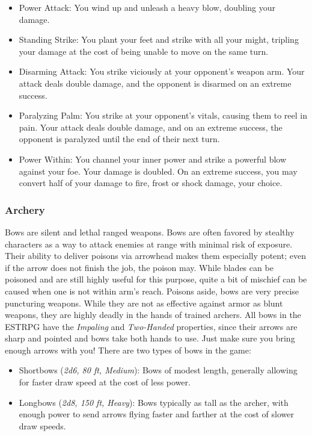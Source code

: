 \begin{itemize}
	\item Power Attack: You wind up and unleash a heavy blow, doubling your damage.
	\item Standing Strike: You plant your feet and strike with all your might, tripling your damage at the cost of being unable to move on the same turn.
	\item Disarming Attack: You strike viciously at your opponent's weapon arm. Your attack deals double damage, and the opponent is disarmed on an extreme success.
	\item Paralyzing Palm: You strike at your opponent's vitals, causing them to reel in pain. Your attack deals double damage, and on an extreme success, the opponent is paralyzed until the end of their next turn.
	\item Power Within: You channel your inner power and strike a powerful blow against your foe. Your damage is doubled. On an extreme success, you may convert half of your damage to fire, frost or shock damage, your choice.
\end{itemize}

\subsubsection{Archery}

Bows are silent and lethal ranged weapons. Bows are often favored by stealthy characters as a way to attack enemies at range with minimal risk of exposure. Their ability to deliver poisons via arrowhead makes them especially potent; even if the arrow does not finish the job, the poison may. While blades can be poisoned and are still highly useful for this purpose, quite a bit of mischief can be caused when one is not within arm's reach. Poisons aside, bows are very precise puncturing weapons. While they are not as effective against armor as blunt weapons, they are highly deadly in the hands of trained archers. All bows in the ESTRPG have the \textit{Impaling} and \textit{Two-Handed} properties, since their arrows are sharp and pointed and bows take both hands to use. Just make sure you bring enough arrows with you! There are two types of bows in the game:

\begin{itemize}
	\item Shortbows (\textit{2d6, 80 ft, Medium}): Bows of modest length, generally allowing for faster draw speed at the cost of less power.
	\item Longbows (\textit{2d8, 150 ft, Heavy}): Bows typically as tall as the archer, with enough power to send arrows flying faster and farther at the cost of slower draw speeds.
\end{itemize}

